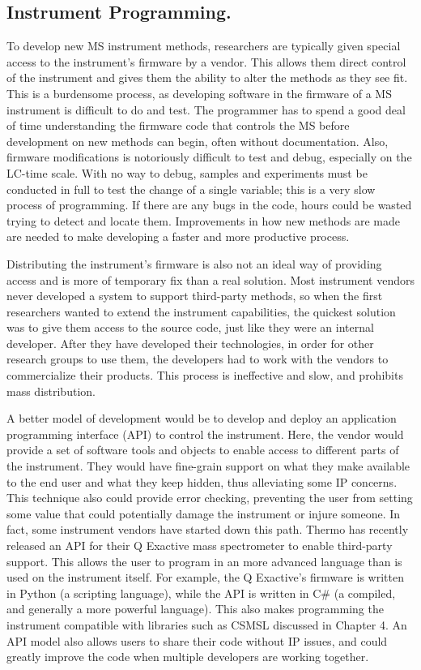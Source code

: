 \subsection*{Instrument Programming.}
To develop new MS instrument methods, researchers are typically given special access to the instrument's firmware by a vendor. This allows them direct control of the instrument and gives them the ability to alter the methods as they see fit. This is a burdensome process, as developing software in the firmware of a MS instrument is difficult to do and test. The programmer has to spend a good deal of time understanding the firmware code that controls the MS before development on new methods can begin, often without documentation. Also, firmware modifications is notoriously difficult to test and debug, especially on the LC-time scale. With no way to debug, samples and experiments must be conducted in full to test the change of a single variable; this is a very slow process of programming. If there are any bugs in the code, hours could be wasted trying to detect and locate them. Improvements in how new methods are made are needed to make developing a faster and more productive process.

Distributing the instrument's firmware is also not an ideal way of providing access and is more of temporary fix than a real solution. Most instrument vendors never developed a system to support third-party methods, so when the first researchers wanted to extend the instrument capabilities, the quickest solution was to give them access to the source code, just like they were an internal developer. After they have developed their technologies, in order for other research groups to use them, the developers had to work with the vendors to commercialize their products. This process is ineffective and slow, and prohibits mass distribution. 

A better model of development would be to develop and deploy an application programming interface (API) to control the instrument. Here, the vendor would provide a set of software tools and objects to enable access to different parts of the instrument. They would have fine-grain support on what they make available to the end user and what they keep hidden, thus alleviating some IP concerns. This technique also could provide error checking, preventing the user from setting some value that could potentially damage the instrument or injure someone. In fact, some instrument vendors have started down this path. Thermo has recently released an API for their Q Exactive mass spectrometer to enable third-party support. This allows the user to program in an more advanced language than is used on the instrument itself. For example, the Q Exactive's firmware is written in Python (a scripting language), while the API is written in C\# (a compiled, and generally a more powerful language). This also makes programming the instrument compatible with libraries such as CSMSL discussed in Chapter 4. An API model also allows users to share their code without IP issues, and could greatly improve the code when multiple developers are working together. 

